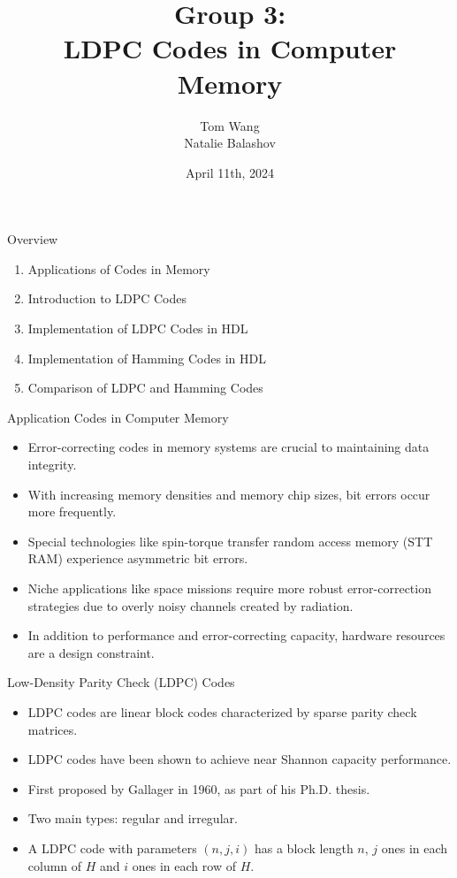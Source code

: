 \documentclass{beamer}
\title{Group 3:\\LDPC Codes in Computer Memory}
\author{Tom Wang\\Natalie Balashov}
\date{April 11th, 2024}
\begin{document}
\begin{frame}
    \titlepage
\end{frame}

\begin{frame}{Overview}
    \begin{enumerate}
        \item Applications of Codes in Memory
        \item Introduction to LDPC Codes
        \item Implementation of LDPC Codes in HDL
        \item Implementation of Hamming Codes in HDL
        \item Comparison of LDPC and Hamming Codes
    \end{enumerate}
\end{frame}

\begin{frame}{Application Codes in Computer Memory}
  \begin{itemize}
    \item Error-correcting codes in memory systems are crucial to maintaining data integrity.
    \item With increasing memory densities and memory chip sizes, bit errors occur more frequently.
    \item Special technologies like spin-torque transfer random access memory (STT RAM) experience asymmetric bit errors.
    \item Niche applications like space missions require more robust error-correction strategies due to overly noisy channels created by radiation.
    \item In addition to performance and error-correcting capacity, hardware resources are a design constraint.
  \end{itemize}
\end{frame}

\begin{frame}{Low-Density Parity Check (LDPC) Codes}
  \begin{itemize}
    \item LDPC codes are linear block codes characterized by sparse parity check matrices.
    \item LDPC codes have been shown to achieve near Shannon capacity performance.
    \item First proposed by Gallager in 1960, as part of his Ph.D. thesis.
    \item Two main types: regular and irregular.
    \item A LDPC code with parameters $(n,j,i)$ has a block length $n$, $j$ ones in each column of $H$ and $i$ ones in each row of $H$.
  \end{itemize}
\end{frame}
\end{document}
